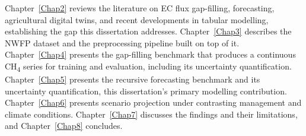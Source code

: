 Chapter~\ref{Chap2} reviews the literature on EC flux gap-filling, forecasting, agricultural
digital twins, and recent developments in tabular modelling, establishing the gap this
dissertation addresses. Chapter~\ref{Chap3} describes the NWFP dataset and the preprocessing
pipeline built on top of it. Chapter~\ref{Chap4} presents the gap-filling benchmark that produces
a continuous CH\textsubscript{4} series for training and evaluation, including its uncertainty
quantification. Chapter~\ref{Chap5} presents the recursive forecasting benchmark and its
uncertainty quantification, this dissertation's primary modelling contribution. Chapter~\ref{Chap6}
presents scenario projection under contrasting management and climate conditions.
Chapter~\ref{Chap7} discusses the findings and their limitations, and Chapter~\ref{Chap8}
concludes.
